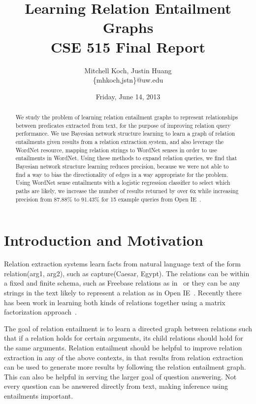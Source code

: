\documentclass{article}
\author{Mitchell Koch, Justin Huang\\\{mhkoch,jstn\}@uw.edu}
\title{Learning Relation Entailment Graphs\\CSE 515 Final Report}
\date{Friday, June 14, 2013}
\begin{document}
\maketitle

\begin{abstract}

We study the problem of learning relation entailment graphs to represent relationships between predicates extracted from text, for the purpose of improving relation query performance. We use Bayesian network structure learning to learn a graph of relation entailments given results from a relation extraction system, and also leverage the WordNet resource, mapping relation strings to WordNet senses in order to use entailments in WordNet. Using these methods to expand relation queries, we find that Bayesian network structure learning reduces precision, because we were not able to find a way to bias the directionality of edges in a way appropriate for the problem. Using WordNet sense entailments with a logistic regression classifier to select which paths are likely, we increase the number of results returned by over 6x while increasing precision from 87.88\% to 91.43\% for 15 example queries from Open IE~\cite{Etzioni:2008:OIE:1409360.1409378}.
\end{abstract}

\section{Introduction and Motivation}

Relation extraction systems learn facts from natural language text of the form \textsf{relation(arg1, arg2)}, such as \textsf{capture(Caesar, Egypt)}. The relations can be within a fixed and finite schema, such as Freebase relations as in~\cite{HoffmannZLZW11} or they can be any strings in the text likely to represent a relation as in Open IE~\cite{Etzioni:2008:OIE:1409360.1409378}. Recently there has been work in learning both kinds of relations together using a matrix factorization approach~\cite{riedel13relation}.

The goal of relation entailment is to learn a directed graph between relations such that if a relation holds for certain arguments, its child relations should hold for the same arguments. Relation entailment should be helpful to improve relation extraction in any of the above contexts, in that results from relation extraction can be used to generate more results by following the relation entailment graph. This can also be helpful in serving the larger goal of question answering. Not every question can be answered directly from text, making inference using entailments important.
\end{document}
